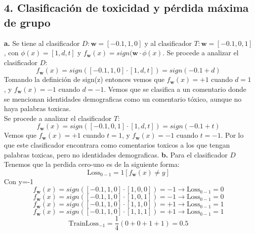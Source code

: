 \documentclass[14pt,a4paper]{report}
\begin{document}
\subsection*{4. Clasificación de toxicidad y pérdida máxima de grupo}
\textbf{a.} Se tiene al clasificador $D:\textbf{w}=[-0.1,1,0]$ y al clasificador $T:\textbf{w}=[-0.1,0,1]$, con $\phi(x)=[1,d,t]$ y $f_{\textbf{w}}(x)=sign(\textbf{w}\cdot\phi(x)$. Se procede a analizar el clasificador $D$:\\
\begin{equation*}
	f_{\textbf{w}}(x)=sign([-0.1,1,0]\cdot[1,d,t])=sign(-0.1+d)
\end{equation*}
Tomando la definición de sign(z) entonces vemos que $f_{\textbf{w}}(x)=+1$ cuando $d=1$, y $f_{\textbf{w}}(x)=-1$ cuando $d=-1$. Vemos que se clasifica a un comentario donde se mencionan identidades demograficas como un comentario tóxico, aunque no haya palabras toxicas. 
\\
Se procede a analizar el clasificador $T$:
\begin{equation*}
	f_{\textbf{w}}(x)=sign([-0.1,0,1]\cdot[1,d,t])=sign(-0.1+t)
\end{equation*}
Vemos que $f_{\textbf{w}}(x)=+1$ cuando $t=1$, y $f_{\textbf{w}}(x)=-1$ cuando $t=-1$. Por lo que este clasificador encontrara como comentarios toxicos a los que tengan palabras toxicas, pero no identidades demograficas. 
\textbf{b.} Para el clasificador $D$
Tenemos que la perdida cero-uno es de la siguiente forma:
	\begin{equation}
		\text{Loss}_{0-1}=1[f_{\textbf{w}}(x)\neq y]
	\end{equation}
	Con y=-1
	\begin{equation*}
		f_{\textbf{w}}(x)=sign([-0.1,1,0]\cdot[1,0,0])=-1\rightarrow
		\text{Loss}_{0-1}=0
	\end{equation*}
	\begin{equation*}
		f_{\textbf{w}}(x)=sign([-0.1,1,0]\cdot[1,0,1])=-1\rightarrow
		\text{Loss}_{0-1}=0
	\end{equation*}
	\begin{equation*}
		f_{\textbf{w}}(x)=sign([-0.1,1,0]\cdot[1,1,0])=+1\rightarrow
		\text{Loss}_{0-1}=1
	\end{equation*}
		\begin{equation*}
		f_{\textbf{w}}(x)=sign([-0.1,1,0]\cdot[1,1,1])=+1\rightarrow
		\text{Loss}_{0-1}=1
	\end{equation*}
	\begin{equation*}
		\text{TrainLoss}_{-1}=\frac{1}{4}(0+0+1+1)=0.5
	\end{equation*}
\end{document}
